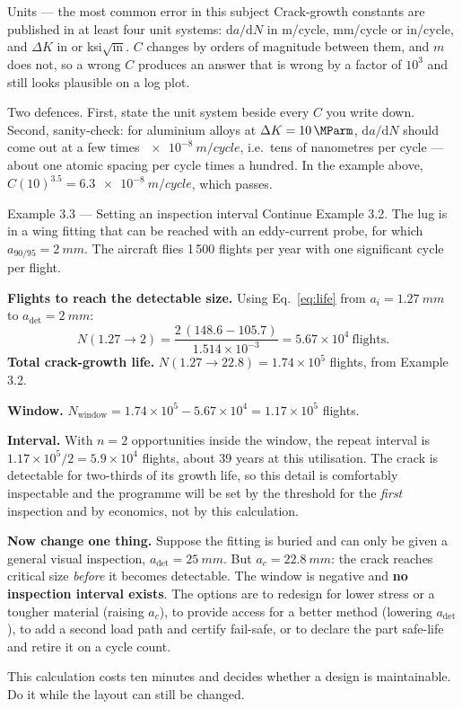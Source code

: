 \documentclass[11pt,a4paper]{article}
\begin{document}
\begin{keybox}{Units --- the most common error in this subject}
Crack-growth constants are published in at least four unit systems: $\mathrm{d}a/\mathrm{d}N$ in \si{m/cycle}, \si{mm/cycle} or in/cycle, and $\Delta K$ in \si{\MParm} or ksi$\sqrt{\text{in}}$. $C$ changes by orders of magnitude between them, and $m$ does not, so a wrong $C$ produces an answer that is wrong by a factor of $10^3$ and still looks plausible on a log plot.

\medskip
Two defences. First, state the unit system beside every $C$ you write down. Second, sanity-check: for aluminium alloys at $\Delta K=\SI{10}{\MParm}$, $\mathrm{d}a/\mathrm{d}N$ should come out at a few times $\SI{e-8}{m/cycle}$, i.e.\ tens of nanometres per cycle --- about one atomic spacing per cycle times a hundred. In the example above, $C(10)^{3.5}=\SI{6.3e-8}{m/cycle}$, which passes.
\end{keybox}

\begin{examplebox}{Example 3.3 --- Setting an inspection interval}
Continue Example 3.2. The lug is in a wing fitting that can be reached with an eddy-current probe, for which $a_{90/95}=\SI{2}{mm}$. The aircraft flies 1\,500 flights per year with one significant cycle per flight.

\textbf{Flights to reach the detectable size.} Using Eq.~\eqref{eq:life} from $a_i=\SI{1.27}{mm}$ to $a_{\mathrm{det}}=\SI{2}{mm}$:
\[
N(1.27\to2)=\frac{2\,(148.6-105.7)}{1.514\times10^{-3}}=5.67\times10^{4}\ \text{flights}.
\]
\textbf{Total crack-growth life.} $N(1.27\to22.8)=1.74\times10^{5}$ flights, from Example 3.2.

\textbf{Window.} $N_{\mathrm{window}}=1.74\times10^{5}-5.67\times10^{4}=1.17\times10^{5}$ flights.

\textbf{Interval.} With $n=2$ opportunities inside the window, the repeat interval is $1.17\times10^{5}/2=5.9\times10^{4}$ flights, about 39 years at this utilisation. The crack is detectable for two-thirds of its growth life, so this detail is comfortably inspectable and the programme will be set by the threshold for the \emph{first} inspection and by economics, not by this calculation.

\medskip
\textbf{Now change one thing.} Suppose the fitting is buried and can only be given a general visual inspection, $a_{\mathrm{det}}=\SI{25}{mm}$. But $a_c=\SI{22.8}{mm}$: the crack reaches critical size \emph{before} it becomes detectable. The window is negative and \textbf{no inspection interval exists}. The options are to redesign for lower stress or a tougher material (raising $a_c$), to provide access for a better method (lowering $a_{\mathrm{det}}$), to add a second load path and certify fail-safe, or to declare the part safe-life and retire it on a cycle count.

\medskip
This calculation costs ten minutes and decides whether a design is maintainable. Do it while the layout can still be changed.
\end{examplebox}
\end{document}
